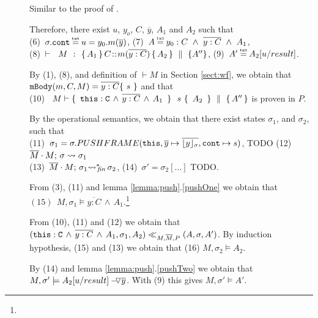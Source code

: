 \begin{description}
\item[{}] Similar to the proof of  {}. 


\item[ {}]

Therefore, there exist $u$, $y_o$, $C$, $\overline y$,  $A_1$ and $A_2$ such that \\
(6)\ $\sigma.\prg{cont}\txteq u=y_0.m(\overline y)$,   \hspace{2cm}
 (7)\ $A \txteq y_0:C  \ \wedge\ \overline {y:C}\ \wedge \  A_1$, 
\\ 
 (8)\ $\promises  M {\mprepostN {A_1}{C}{m}{y}{C}{A_2} {A''}}$,    \hspace{1cm}
 (9)\ $A' \txteq  A_2[ u/result]$. 

By (1), (8), and definition of $\vdash M$ in Section \ref{sect:wf}, we obtain that   $\prg{mBody}(m,C,M)=\overline{y:C}\{\  s \ \}$ and that\\
(10) \  $M \vdash  \quadruple { \ \prg{this}:\prg{C}\, \wedge\, \overline{y:C}\, \wedge\, A_1\  } {\ s\ } {\ A_2\ } {A''}$ is proven in $P$.
 
 By the operational semantics, we obtain that there exist states $\sigma_1$, and $\sigma_2$, such that \\
 (11)\ $\sigma_1=\sigma.PUSHFRAME(\prg{this}, {\overline y} \mapsto \overline{\interpret {\sigma} y},\prg{cont} \mapsto s) $, TODO   \hspace{1cm}
   (12)\ $\leadstoBounded  {\Mtwo\cdot M}  {\sigma}  {\sigma_1}$ \\
 (13)\ $\leadstoBoundedStarFin {\Mtwo\cdot M}  {\sigma_1}  {\sigma_2}$,   \hspace{3cm}
 (14)\ $\sigma'=\sigma_2[...]$ TODO.
 
 From (3), (11) and lemma \ref{lemma:push}.\ref{pushOne}  we obtain that \ \ \  $ (15) \ \ M, \sigma_1 \models \overline{y:C}\, \wedge\, A_1$.\footnote{}
 
 From (10), (11) and (12) we obtain that $( \prg{this}:\prg{C}\, \wedge\, \overline{y:C}\, \wedge\, A_1,\sigma_1,A_2) \ll_{M,\Mtwo,P} (A,\sigma,A')$. By induction hypothesis, (15) and (13) we obtain that (16) $M,\sigma_2 \models A_2$.
 
 By (14) and lemma  \ref{lemma:push}.\ref{pushTwo}  we obtain that 
\ \ $M,\sigma' \models \PushAS  {y} {A_2[ u/result]}$. \. With (9) this gives $M,\sigma' \models A'$.


\end{description}
